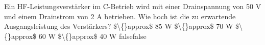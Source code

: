     {Ein HF-Leistungsverstärker im C-Betrieb wird mit einer Drainspannung von 50 V und einem Drainstrom von 2 A betrieben. Wie hoch ist die zu erwartende Ausgangsleistung des Verstärkers?}
    {\$\textbackslash\{\}approx\$ 85 W}
    {\$\textbackslash\{\}approx\$ 70 W}
    {\$\textbackslash\{\}approx\$ 60 W}
    {\$\textbackslash\{\}approx\$ 40 W}
    {false}{false}